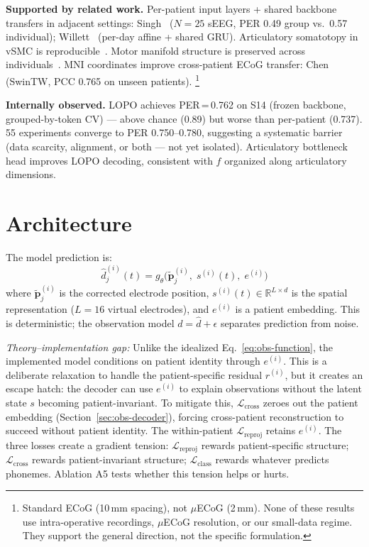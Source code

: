 \documentclass[11pt,letterpaper]{article}
\newcommand{\bfp}{\mathbf{p}}
\newcommand{\R}{\mathbb{R}}
\begin{document}
\textbf{Supported by related work.}
Per-patient input layers + shared backbone transfers in adjacent settings: Singh~\cite{singh2025} ($N{=}25$ sEEG, PER 0.49 group vs.\ 0.57 individual); Willett~\cite{willett2023} (per-day affine + shared GRU).
Articulatory somatotopy in vSMC is reproducible~\cite{metzger2023,bouchard2013}.
Motor manifold structure is preserved across individuals~\cite{safaie2023,gallego2020}.
MNI coordinates improve cross-patient ECoG transfer: Chen~\cite{chen2025} (SwinTW, PCC 0.765 on unseen patients).%
\footnote{Standard ECoG (10\,mm spacing), not $\mu$ECoG (2\,mm). None of these results use intra-operative recordings, $\mu$ECoG resolution, or our small-data regime. They support the general direction, not the specific formulation.}

\textbf{Internally observed.}
LOPO achieves PER\,=\,0.762 on S14 (frozen backbone, grouped-by-token CV) --- above chance (0.89) but worse than per-patient (0.737).
55 experiments converge to PER 0.750--0.780, suggesting a systematic barrier (data scarcity, alignment, or both --- not yet isolated).
Articulatory bottleneck head improves LOPO decoding, consistent with $f$ organized along articulatory dimensions.



\section{Architecture}\label{sec:architecture}

The model prediction is:
\begin{equation}\label{eq:implemented}
\boxed{\hat{d}_j^{(i)}(t) = g_\theta\bigl(\tilde{\bfp}_j^{(i)},\; s^{(i)}(t),\; e^{(i)}\bigr)}
\end{equation}
where $\tilde{\bfp}_j^{(i)}$ is the corrected electrode position, $s^{(i)}(t) \in \R^{L \times d}$ is the spatial representation ($L{=}16$ virtual electrodes), and $e^{(i)}$ is a patient embedding. This is deterministic; the observation model $d = \hat{d} + \epsilon$ separates prediction from noise.

\textcolor{BrickRed}{\textit{Theory--implementation gap:}} Unlike the idealized Eq.~\ref{eq:obs-function}, the implemented model conditions on patient identity through $e^{(i)}$. This is a deliberate relaxation to handle the patient-specific residual $r^{(i)}$, but it creates an escape hatch: the decoder can use $e^{(i)}$ to explain observations without the latent state $s$ becoming patient-invariant. To mitigate this, $\mathcal{L}_{\text{cross}}$ zeroes out the patient embedding (Section~\ref{sec:obs-decoder}), forcing cross-patient reconstruction to succeed without patient identity. The within-patient $\mathcal{L}_{\text{reproj}}$ retains $e^{(i)}$. The three losses create a gradient tension: $\mathcal{L}_{\text{reproj}}$ rewards patient-specific structure; $\mathcal{L}_{\text{cross}}$ rewards patient-invariant structure; $\mathcal{L}_{\text{class}}$ rewards whatever predicts phonemes. Ablation A5 tests whether this tension helps or hurts.
\end{document}
